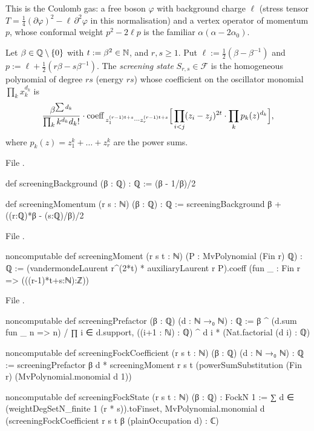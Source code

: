 \begin{physics}
This is the Coulomb gas: a free boson $\varphi$ with background charge $\ell$ (stress tensor
$T = \frac14(\partial\varphi)^2-\ell\,\partial^2\varphi$ in this normalisation) and a vertex operator of
momentum $p$, whose conformal weight $p^2-2\ell p$ is the familiar $\alpha(\alpha-2\alpha_0)$.
\end{physics}

\begin{definition}\label{l06:def:screenstate}
Let $\beta\in{\mathbb{Q}}\setminus\{0\}$ with $t := \beta^2\in{\mathbb{N}}$, and $r,s\ge1$. Put
$\ell := \frac12(\beta-\beta^{-1})$ and $p := \ell+\frac12(r\beta-s\beta^{-1})$. The \emph{screening state}
$S_{r,s}\in\mathcal F$ is the homogeneous polynomial of degree $rs$ (energy $rs$) whose coefficient on the
oscillator monomial $\prod_k x_k^{d_k}$ is
\begin{equation*}
 \frac{\beta^{\sum d_k}}{\prod_k k^{d_k}d_k!}\cdot
 \operatorname{coeff}_{\,z_1^{(r-1)t+s}\cdots z_r^{(r-1)t+s}}\Bigl[\,\prod_{i<j}(z_i-z_j)^{2t}\cdot
 \prod_k p_k(z)^{d_k}\Bigr],
\end{equation*}
where $p_k(z) = z_1^k+\dots+z_r^k$ are the power sums.
\end{definition}

File .
\begin{leancode}
def screeningBackground (β : ℚ) : ℚ := (β - 1/β)/2

def screeningMomentum (r s : ℕ) (β : ℚ) : ℚ :=
  screeningBackground β + ((r:ℚ)*β - (s:ℚ)/β)/2
\end{leancode}
File .
\begin{leancode}
noncomputable def screeningMoment (r s t : ℕ) (P : MvPolynomial (Fin r) ℚ) : ℚ :=
  (vandermondeLaurent r^(2*t) * auxiliaryLaurent r P).coeff
    (fun _ : Fin r => (((r-1)*t+s:ℕ):ℤ))
\end{leancode}
File .
\begin{leancode}
noncomputable def screeningPrefactor (β : ℚ) (d : ℕ →₀ ℕ) : ℚ :=
  β ^ (d.sum fun _ n => n) /
    ∏ i ∈ d.support, ((i+1 : ℕ) : ℚ) ^ d i * (Nat.factorial (d i) : ℚ)

noncomputable def screeningFockCoefficient (r s t : ℕ) (β : ℚ) (d : ℕ →₀ ℕ) : ℚ :=
  screeningPrefactor β d * screeningMoment r s t
    (powerSumSubstitution (Fin r) (MvPolynomial.monomial d 1))

noncomputable def screeningFockState (r s t : ℕ) (β : ℚ) : FockN 1 :=
  ∑ d ∈ (weightDegSetN_finite 1 (r * s)).toFinset,
    MvPolynomial.monomial d (screeningFockCoefficient r s t β (plainOccupation d) : ℂ)
\end{leancode}

